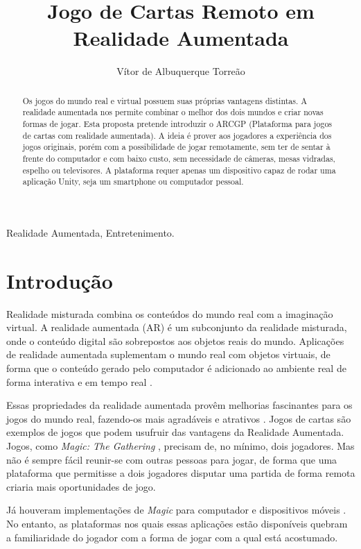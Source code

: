 \documentclass[conference]{IEEEtran}
\title{Jogo de Cartas Remoto em Realidade Aumentada}
\author{Vítor de Albuquerque Torreão}
\begin{document}
\maketitle

\begin{abstract}
	Os jogos do mundo real e virtual possuem suas próprias vantagens distintas. 
	A realidade aumentada nos permite combinar o melhor dos dois mundos e criar 
	novas formas de jogar. Esta proposta pretende introduzir o ARCGP (Plataforma 
	para jogos de cartas com realidade aumentada). A ideia é prover aos 
	jogadores a experiência dos jogos originais, porém com a possibilidade de 
	jogar remotamente, sem ter de sentar à frente do computador e com baixo 
	custo, sem necessidade de câmeras, mesas vidradas, espelho ou televisores. 
	A plataforma requer apenas um dispositivo capaz de rodar uma aplicação 
	Unity, seja um smartphone ou computador pessoal.
\end{abstract}

\begin{IEEEkeywords}
	Realidade Aumentada, Entretenimento.
\end{IEEEkeywords}

\section{Introdução}
Realidade misturada combina os conteúdos do mundo real com a imaginação virtual.
A realidade aumentada (AR) é um subconjunto da realidade misturada, onde o 
conteúdo digital são sobrepostos aos objetos reais do mundo. Aplicações de 
realidade aumentada suplementam o mundo real com objetos virtuais, de forma que 
o conteúdo gerado pelo computador é adicionado ao ambiente real de forma 
interativa e em tempo real \cite{burdea2003virtual}.

Essas propriedades da realidade aumentada provêm melhorias fascinantes para os 
jogos do mundo real, fazendo-os mais agradáveis e atrativos 
\cite{Lam:2006:AAR:1128923.1128987}. Jogos de cartas são exemplos de jogos que 
podem usufruir das vantagens da Realidade Aumentada. Jogos, como \textit{Magic: 
The Gathering} \cite{magic}, precisam de, no mínimo, dois jogadores. Mas não é 
sempre fácil reunir-se com outras pessoas para jogar, de forma que uma 
plataforma que permitisse a dois jogadores disputar uma partida de forma 
remota criaria mais oportunidades de jogo.

Já houveram implementações de \textit{Magic} para computador e dispositivos 
móveis \cite{magic_duels}. No entanto, as plataformas nos quais essas 
aplicações estão disponíveis quebram  a familiaridade do jogador com a forma 
de jogar com a qual está acostumado.
\end{document}
